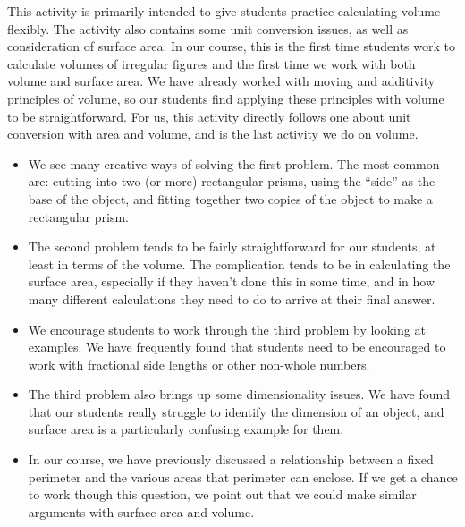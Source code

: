 \documentclass{ximera}
\begin{document}
\newpage
\begin{instructorNotes}
This activity is primarily intended to give students practice calculating volume flexibly.  The activity also contains some unit conversion issues, as well as consideration of surface area.  In our course, this is the first time students work to calculate volumes of irregular figures and the first time we work with both volume and surface area.  We have already worked with moving and additivity principles of volume, so our students find applying these principles with volume to be straightforward.  For us, this activity directly follows one about unit conversion with area and volume, and is the last activity we do on volume.

\begin{itemize}
    \item We see many creative ways of solving the first problem.  The most common are: cutting into two (or more) rectangular prisms, using the ``side'' as the base of the object, and fitting together two copies of the object to make a rectangular prism.
    \item The second problem tends to be fairly straightforward for our students, at least in terms of the volume.  The complication tends to be in calculating the surface area, especially if they haven't done this in some time, and in how many different calculations they need to do to arrive at their final answer. 
    \item We encourage students to work through the third problem by looking at examples.  We have frequently found that students need to be encouraged to work with fractional side lengths or other non-whole numbers.
    \item The third problem also brings up some dimensionality issues.  We have found that our students really struggle to identify the dimension of an object, and surface area is a particularly confusing example for them.  
    \item In our course, we have previously discussed a relationship between a fixed perimeter and the various areas that perimeter can enclose.  If we get a chance to work though this question, we point out that we could make similar arguments with surface area and volume.

\end{itemize}


\end{instructorNotes}
\end{document}
